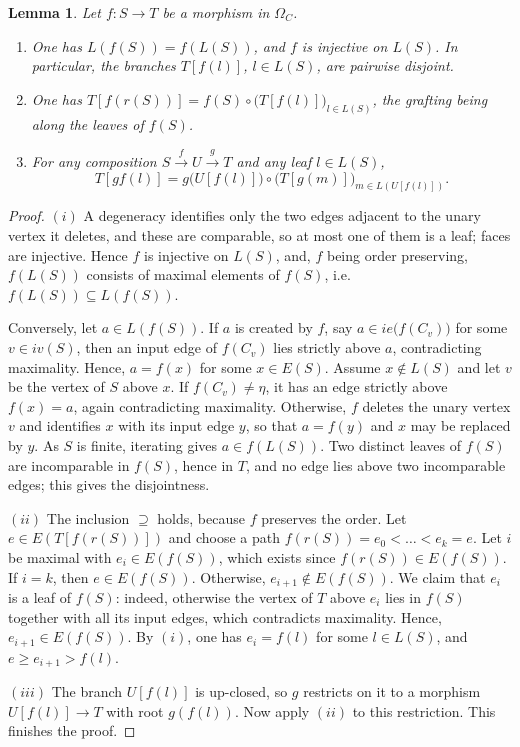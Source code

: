 \documentclass{amsart}
\newtheorem{lemma}[formula]{Lemma}
\theoremstyle{definition}
\theoremstyle{remark}
\begin{document}
	\begin{lemma}\label{lm:branches}
		Let $f\colon S\to T$ be a morphism in $\Omega_{C}$.
		\begin{enumerate}[label=(\roman*)]
			\item One has $L(f(S))=f(L(S))$, and $f$ is injective on $L(S)$. 
			In particular, the branches $T[f(l)]$,
			$l\in L(S)$, are pairwise disjoint.
			\item One has $T[f(r(S))]=f(S)\circ\bigl(T[f(l)]\bigr)_{l\in L(S)}$, the grafting being along the
			leaves of $f(S)$.
			\item For any composition $S\xrightarrow{f}U\xrightarrow{g}T$ and any leaf $l\in L(S)$,
			\[
			T[gf(l)]=g\bigl(U[f(l)]\bigr)\circ\bigl(T[g(m)]\bigr)_{m\in L(U[f(l)])}.
			\]
		\end{enumerate}
	\end{lemma}
	\begin{proof}
		$(i)$ A degeneracy identifies only the two edges adjacent to the unary vertex it
		deletes, and these are comparable, so at most one of them is a leaf; faces are
		injective. Hence $f$ is injective on $L(S)$, and, $f$ being order preserving,
		$f(L(S))$ consists of maximal elements of $f(S)$, i.e. $f(L(S))\subseteq L(f(S))$.
		
		Conversely, let $a\in L(f(S))$. If $a$ is created by $f$, say
		$a\in ie\bigl(f(C_v)\bigr)$ for some $v\in iv(S)$, then an
		input edge of $f(C_v)$ lies strictly above $a$, contradicting maximality.
		Hence, $a=f(x)$ for some $x\in E(S)$. Assume $x\notin L(S)$ and let $v$ be the vertex of $S$
		above $x$. 
		If $f(C_v)\neq\eta$, it has an edge strictly above $f(x)=a$, again
		contradicting maximality. 
		Otherwise, $f$ deletes the unary vertex $v$ and identifies $x$ with its input edge $y$, so that $a=f(y)$ and $x$ may be replaced by $y$. 
		As $S$ is finite, iterating gives $a\in f(L(S))$.
		Two distinct leaves of $f(S)$ are incomparable in $f(S)$, hence in $T$, and no edge lies above two incomparable
		edges; this gives the disjointness.
		
		$(ii)$ The inclusion $\supseteq$ holds, because $f$ preserves the order. 
		Let $e\in E(T[f(r(S))])$ and choose
		a path $f(r(S))=e_0<\dots<e_k=e$. Let $i$ be maximal with $e_i\in E(f(S))$, which exists since
		$f(r(S))\in E(f(S))$. 
		If $i=k$, then $e\in E(f(S))$. 
		Otherwise, $e_{i+1}\notin E(f(S))$.
		We claim that $e_i$ is a leaf of $f(S)$: indeed, otherwise the vertex of $T$ above $e_i$ lies in $f(S)$ together with all its input edges, which contradicts maximality.
		Hence, $e_{i+1}\in E(f(S))$. 
		By $(i)$, one has $e_i=f(l)$ for some $l\in L(S)$, and
		$e\geqslant e_{i+1}>f(l)$.
		
		$(iii)$ The branch $U[f(l)]$ is up-closed, so $g$ restricts on it to a morphism $U[f(l)]\to T$ with root
		$g(f(l))$.
		Now apply $(ii)$ to this restriction.
		This finishes the proof.
	\end{proof}
		
\end{document}
